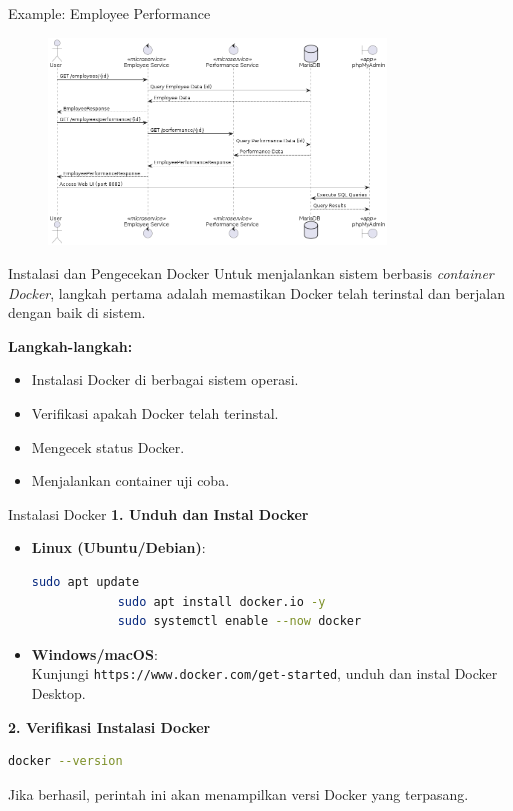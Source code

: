 \documentclass[aspectratio=169, table]{beamer}
\begin{document}
\begin{frame}{Example: Employee Performance}
	\vspace{10pt}
	\begin{figure}
		\centering
		\includegraphics[width=0.8\textwidth]{../../images/out/microservices-employees.png}
		\label{fig:employee_performance}
	\end{figure}
\end{frame}

\begin{frame}{Instalasi dan Pengecekan Docker}
	Untuk menjalankan sistem berbasis \textit{container Docker}, langkah pertama adalah memastikan Docker telah terinstal dan berjalan dengan baik di sistem.
	
	\textbf{Langkah-langkah:}
	\begin{itemize}
		\item Instalasi Docker di berbagai sistem operasi.
		\item Verifikasi apakah Docker telah terinstal.
		\item Mengecek status Docker.
		\item Menjalankan container uji coba.
	\end{itemize}
\end{frame}

\begin{frame}[fragile]{Instalasi Docker}
	\textbf{1. Unduh dan Instal Docker} \\
	\begin{itemize}
		\item \textbf{Linux (Ubuntu/Debian)}:
		\begin{lstlisting}[language=bash]
			sudo apt update
			sudo apt install docker.io -y
			sudo systemctl enable --now docker
		\end{lstlisting}
		\item \textbf{Windows/macOS}: \\
		Kunjungi \texttt{https://www.docker.com/get-started}, unduh dan instal Docker Desktop.
	\end{itemize}
	
	\textbf{2. Verifikasi Instalasi Docker} \\
	\begin{lstlisting}[language=bash]
		docker --version
	\end{lstlisting}
	Jika berhasil, perintah ini akan menampilkan versi Docker yang terpasang.
\end{frame}
\end{document}
